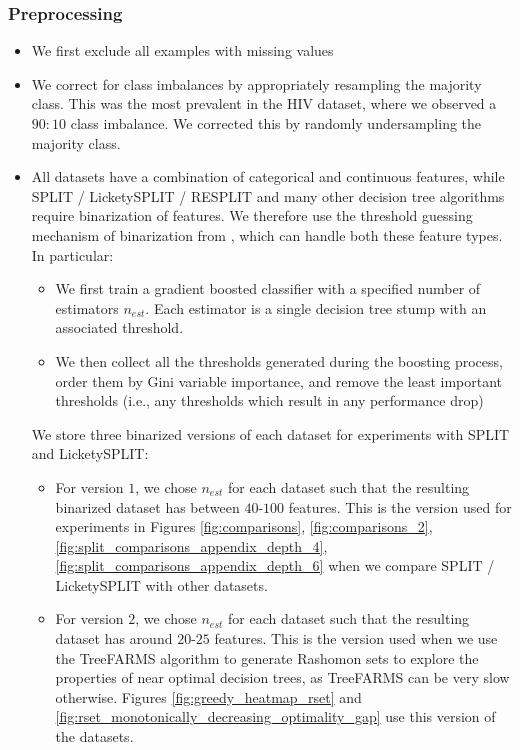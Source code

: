 \subsubsection{Preprocessing}
\begin{itemize}
    \item We first exclude all examples with missing values
    \item We correct for class imbalances by appropriately resampling the majority class. This was the most prevalent in the HIV dataset, where we observed a $90:10$ class imbalance. We corrected this by randomly undersampling the majority class. 
    \item All datasets have a combination of categorical and continuous features, while SPLIT / LicketySPLIT / RESPLIT and many other decision tree algorithms require binarization of features. We therefore use the threshold guessing mechanism of binarization from \citet{gosdt_guesses}, which can handle both these feature types. In particular:
    \begin{itemize}
        \item We first train a gradient boosted classifier with a specified number of estimators $n_{est}$. Each estimator is a single decision tree stump with an associated threshold. 
        \item We then collect all the thresholds generated during the boosting process, order them by Gini variable importance, and remove the least important thresholds (i.e., any thresholds which result in any performance drop)
    \end{itemize}
    We store three binarized versions of each dataset for experiments with SPLIT and LicketySPLIT:
    \begin{itemize}
        \item For version $1$, we chose $n_{est}$ for each dataset such that the resulting binarized dataset has between $40$-$100$ features. This is the version used for experiments in Figures \ref{fig:comparisons}, \ref{fig:comparisons_2}, \ref{fig:split_comparisons_appendix_depth_4}, \ref{fig:split_comparisons_appendix_depth_6} when we compare SPLIT / LicketySPLIT with other datasets.
        \item For version $2$, we chose $n_{est}$ for each dataset such that the resulting dataset has around $20$-$25$ features. This is the version used when we use the TreeFARMS algorithm \cite{xin2022treefarms} to generate Rashomon sets to explore the properties of near optimal decision trees, as TreeFARMS can be very slow otherwise. Figures \ref{fig:greedy_heatmap_rset} and \ref{fig:rset_monotonically_decreasing_optimality_gap} use this version of the datasets.

\end{itemize}
\end{itemize}
